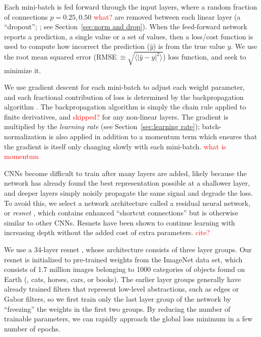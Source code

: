 \documentclass[fleqn,usenatbib]{mnras}
\newcommand{\editorial}[1]{\textcolor{red}{#1}}
\begin{document}
Each mini-batch is fed forward through the input layers, where a random fraction of connections $p=0.25, 0.50$ \editorial{what?} are removed between each linear layer (a ``dropout''; \citealt{Hinton2012}; see Section~\ref{sec:norm and drop}). When the feed-forward network reports a prediction, a single value or a set of values, then a loss/cost function is used to compute how incorrect the prediction ($\hat y$) is from the true value $y$. We use the root mean squared error (RMSE$~\equiv \sqrt{\langle |\hat y - y|^2\rangle}$) loss function, and seek to minimize it.

We use gradient descent for each mini-batch to adjust each weight parameter, and each fractional contribution of loss is determined by the backpropagation algorithm \citep{LeCun1989}. The backpropagation algorithm is simply the chain rule applied to finite derivatives, and \editorial{skipped?} for any non-linear layers. The gradient is multiplied by the \textit{learning rate} (see Section~\ref{sec:learning rate}); batch-normalization is also applied in addition to a momentum term which ensures that the gradient is itself only changing slowly with each mini-batch. \editorial{what is momentum}

CNNs become difficult to train after many layers are added, likely because the network has already found the best representation possible at a shallower layer, and deeper layers simply noisily propagate the same signal and degrade the loss. To avoid this, we select a network architecture called a residual neural network, or \textit{resnet} \citep{He2016}, which contains enhanced ``shortcut connections'' but is otherwise similar to other CNNs. Resnets have been shown to continue learning with increasing depth without the added cost of extra parameters. \editorial{cite?}

We use a 34-layer resnet \citep{He2016}, whose architecture consists of three layer groups. Our resnet is initialized to pre-trained weights from the ImageNet data set, which consists of 1.7 million images belonging to 1000 categories of objects found on Earth (\eg, cats, horses, cars, or books). The earlier layer groups generally have already trained filters that represent low-level abstractions, such as edges or Gabor filters, so we first train only the last layer group of the network by ``freezing'' the weights in the first two groups. By reducing the number of trainable parameters, we can rapidly approach the global loss minimum in a few number of epochs.
\end{document}
